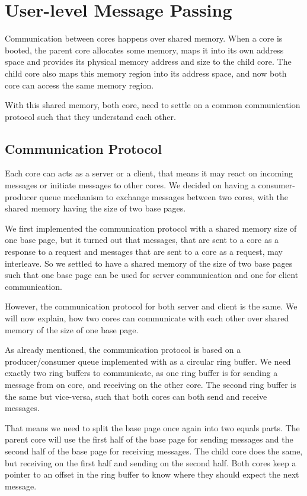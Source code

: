 \chapter{User-level Message Passing}

Communication between cores happens over shared memory. When a core is booted,
the parent core allocates some memory, maps it into its own address space and
provides its physical memory address and size to the child core. The child core
also maps this memory region into its address space, and now both core can
access the same memory region.

With this shared memory, both core, need to settle on a common communication
protocol such that they understand each other.

\section{Communication Protocol}

Each core can acts as a server or a client, that means it may react on incoming
messages or initiate messages to other cores.  We decided on having a
consumer-producer queue mechanism to exchange messages between two cores, with
the shared memory having the size of two base pages. 

We first implemented the communication protocol with a shared memory size of one
base page, but it turned out that messages, that are sent to a core as a
response to a request and messages that are sent to a core as a request, may
interleave. So we settled to have a shared memory of the size of two base pages
such that one base page can be used for server communication and one for client
communication. 

However, the communication protocol for both server and client is the same. We
will now explain, how two cores can communicate with each other over shared
memory of the size of one base page.

As already mentioned, the communication protocol is based on a producer/consumer
queue implemented with as a circular ring buffer. We need exactly two ring
buffers to communicate, as one ring buffer is for sending a message from on
core, and receiving on the other core. The second ring buffer is the same but
vice-versa, such that both cores can both send and receive messages. 

That means we need to split the base page once again into two equals parts. The
parent core will use the first half of the base page for sending messages and
the second half of the base page for receiving messages. The child core does the
same, but receiving on the first half and sending on the second half. Both cores
keep a pointer to an offset in the ring buffer to know where they should expect
the next message.

